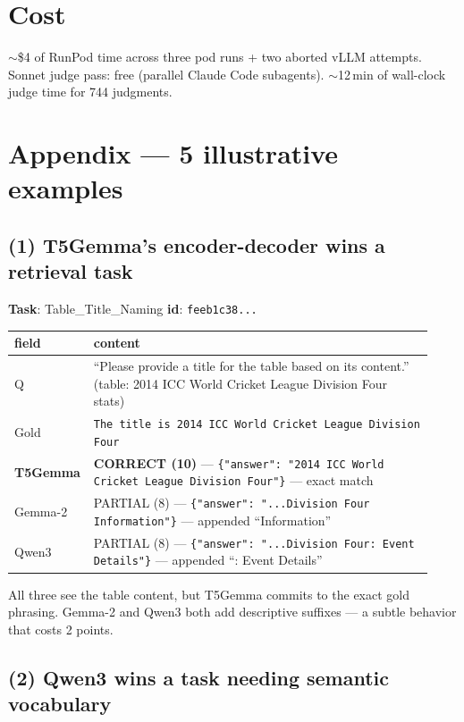 \documentclass[11pt]{article}
\begin{document}
\section*{Cost}

$\sim$\$4 of RunPod time across three pod runs + two aborted vLLM attempts.
Sonnet judge pass: free (parallel Claude Code subagents). $\sim$12\,min of
wall-clock judge time for 744 judgments.

\clearpage
\section*{Appendix --- 5 illustrative examples}

\subsection*{(1) T5Gemma's encoder-decoder wins a retrieval task}

\textbf{Task}: Table\_Title\_Naming \quad \textbf{id}: \texttt{feeb1c38...}

\begin{center}\small
\begin{tabular}{p{0.13\linewidth}p{0.80\linewidth}}
\toprule
\textbf{field} & \textbf{content} \\
\midrule
Q    & ``Please provide a title for the table based on its content.'' (table: 2014 ICC World Cricket League Division Four stats) \\
Gold & \texttt{The title is 2014 ICC World Cricket League Division Four} \\
\rowcolor{hilite}
\textbf{T5Gemma} & \textbf{CORRECT (10)} --- \texttt{\{"answer": "2014 ICC World Cricket League Division Four"\}} --- exact match \\
Gemma-2 & PARTIAL (8) --- \texttt{\{"answer": "...Division Four Information"\}} --- appended ``Information'' \\
Qwen3 & PARTIAL (8) --- \texttt{\{"answer": "...Division Four: Event Details"\}} --- appended ``: Event Details'' \\
\bottomrule
\end{tabular}
\end{center}

All three see the table content, but T5Gemma commits to the exact gold
phrasing. Gemma-2 and Qwen3 both add descriptive suffixes --- a subtle
behavior that costs 2 points.

\subsection*{(2) Qwen3 wins a task needing semantic vocabulary}
\end{document}
